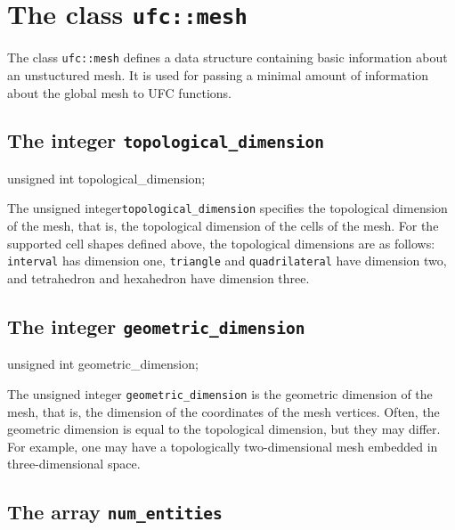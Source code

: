 \section{The class \texttt{ufc::mesh}}

The class \texttt{ufc::mesh} defines a data structure containing basic
information about an unstuctured mesh. It is used for passing a
minimal amount of information about the global mesh to UFC
functions.

\subsection{The integer \texttt{topological\_dimension}}

\begin{code}
unsigned int topological_dimension;
\end{code}

The unsigned integer\texttt{topological\_dimension}
specifies the topological dimension of the mesh, that is, the
topological dimension of the cells of the mesh. For the supported
cell shapes defined above, the topological dimensions are as follows:
\texttt{interval} has dimension one, \texttt{triangle} and
\texttt{quadri\-lateral} have dimension two, and tetrahedron and
hexahedron have dimension three.

\subsection{The integer \texttt{geometric\_dimension}}

\begin{code}
unsigned int geometric_dimension;
\end{code}

The unsigned integer \texttt{geometric\_dimension} is the geometric dimension
of the mesh, that is, the dimension of the coordinates of the mesh vertices.
Often, the geometric dimension is equal to the topological dimension,
but they may differ. For example, one may have a topologically
two-dimensional mesh embedded in three-dimensional space.

\subsection{The array \texttt{num\_entities}}

